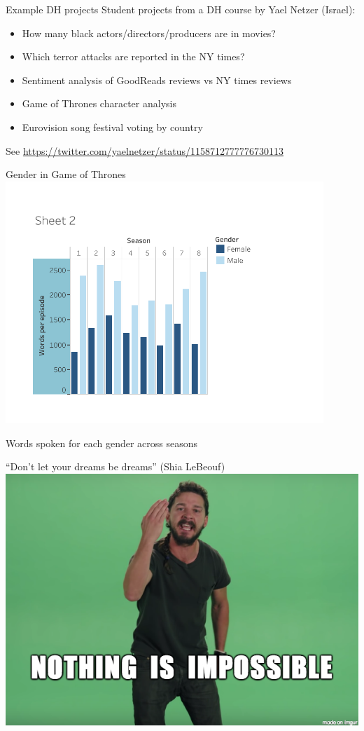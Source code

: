 \documentclass{beamer}
\begin{document}
\begin{frame}{Example DH projects}
    Student projects from a DH course by Yael Netzer (Israel):
    \begin{itemize}
        \item How many black actors/directors/producers are in movies?
        \item Which terror attacks are reported in the NY times?
        \item Sentiment analysis of GoodReads reviews vs NY times reviews
        \item Game of Thrones character analysis
        \item Eurovision song festival voting by country
    \end{itemize}

    See \url{https://twitter.com/yaelnetzer/status/1158712777776730113}
\end{frame}

\begin{frame}{Gender in Game of Thrones}\centering
    \includegraphics[width=0.9\textwidth]{fig/got}

	Words spoken for each gender across seasons
\end{frame}


\begin{frame}{``Don't let your dreams be dreams'' (Shia LeBeouf)}
   \includegraphics[width=\textwidth]{fig/nothingisimpossible}
\end{frame}
\end{document}
